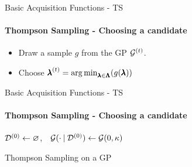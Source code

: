 \begin{frame}[c]{Basic Acquisition Functions - TS}
\framesubtitle{Thompson Sampling - Choosing a candidate}

\begin{itemize}
    \item Draw a sample $g$ from the GP $\iter{\gp}$.
    \item Choose $\bonextsample=\argmin_{\conf\in\pcs}(g(\conf))$
\end{itemize}
\end{frame}
\begin{frame}[c]{Basic Acquisition Functions - TS}
\framesubtitle{Thompson Sampling - Choosing a candidate}
\begin{center}
\begin{minipage}{0.75\textwidth}
\begin{algorithm}[H]
    \LinesNumbered
    \SetAlgoLined
    \setcounter{AlgoLine}{0}
    
    
    $\iter[0]{\dataset}\leftarrow\varnothing$,$\quad\gp(\cdot \given \iter[0]{\dataset})\leftarrow\gp(0, \kernel)$\;
    
    \caption{Thompson Sampling on a GP}
\end{algorithm}
\end{minipage}
\end{center}
\end{frame}
